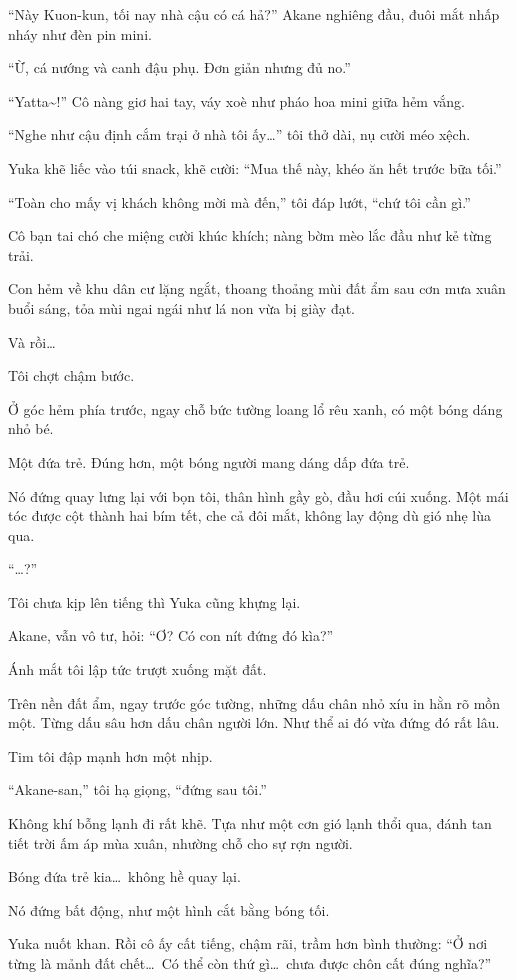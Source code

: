 \documentclass[../main.tex]{subfiles}
\begin{document}
``Này Kuon-kun, tối nay nhà cậu có cá hả?'' Akane nghiêng đầu, đuôi mắt nhấp nháy như đèn pin mini.

``Ừ, cá nướng và canh đậu phụ. Đơn giản nhưng đủ no.''

``Yatta\~{}!'' Cô nàng giơ hai tay, váy xoè như pháo hoa mini giữa hẻm vắng.

``Nghe như cậu định cắm trại ở nhà tôi ấy\dots'' tôi thở dài, nụ cười méo xệch.

Yuka khẽ liếc vào túi snack, khẽ cười: ``Mua thế này, khéo ăn hết trước bữa tối.''

``Toàn cho mấy vị khách không mời mà đến,'' tôi đáp lướt, ``chứ tôi cần gì.''

Cô bạn tai chó che miệng cười khúc khích; nàng bờm mèo lắc đầu như kẻ từng trải.

Con hẻm về khu dân cư lặng ngắt, thoang thoảng mùi đất ẩm sau cơn mưa xuân buổi sáng, tỏa mùi ngai ngái như lá non vừa bị giày đạt.

Và rồi\dots

Tôi chợt chậm bước.

Ở góc hẻm phía trước, ngay chỗ bức tường loang lổ rêu xanh, có một bóng dáng nhỏ bé.

Một đứa trẻ. Đúng hơn, một bóng người mang dáng dấp đứa trẻ.

Nó đứng quay lưng lại với bọn tôi, thân hình gầy gò, đầu hơi cúi xuống. Một mái tóc được cột thành hai bím tết, che cả đôi mắt, không lay động dù gió nhẹ lùa qua.

``\dots?''

Tôi chưa kịp lên tiếng thì Yuka cũng khựng lại.

Akane, vẫn vô tư, hỏi: ``Ơ? Có con nít đứng đó kìa?''

Ánh mắt tôi lập tức trượt xuống mặt đất.

Trên nền đất ẩm, ngay trước góc tường, những dấu chân nhỏ xíu in hằn rõ mồn một. Từng dấu sâu hơn dấu chân người lớn. Như thể ai đó vừa đứng đó rất lâu.

Tim tôi đập mạnh hơn một nhịp.

``Akane-san,'' tôi hạ giọng, ``đứng sau tôi.''

Không khí bỗng lạnh đi rất khẽ. Tựa như một cơn gió lạnh thổi qua, đánh tan tiết trời ấm áp mùa xuân, nhường chỗ cho sự rợn người.

Bóng đứa trẻ kia\dots\ không hề quay lại.

Nó đứng bất động, như một hình cắt bằng bóng tối.

Yuka nuốt khan. Rồi cô ấy cất tiếng, chậm rãi, trầm hơn bình thường: ``Ở nơi từng là mảnh đất chết\dots\ Có thể còn thứ gì\dots\ chưa được chôn cất đúng nghĩa?''
\end{document}
